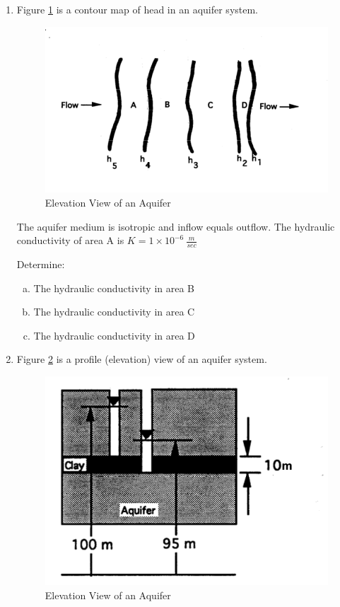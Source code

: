 \documentclass[12pt]{article}
\begin{document}
\begin{enumerate}
\clearpage
\item Figure \ref{fig:HorizontalAquifer} is a contour map of head in an aquifer system. 
\begin{figure}[h!] %
   \centering
   \includegraphics[width=5in]{PlanViewHeads.png} 
   \caption{Elevation View of an Aquifer }
   \label{fig:HorizontalAquifer}
\end{figure}

The aquifer medium is isotropic and inflow equals outflow.
The hydraulic conductivity of area A is $K=1 \times 10^{-6}~\frac{m}{sec}$

Determine:
    \begin{enumerate}[a)]
        \item The hydraulic conductivity in area B
        \item The hydraulic conductivity in area C
        \item The hydraulic conductivity in area D
    \end{enumerate}

\clearpage
\item Figure \ref{fig:VerticalAquifer} is a profile (elevation) view of an aquifer system. 
\begin{figure}[h!] %
   \centering
   \includegraphics[width=5in]{VerticalAquifer.png} 
   \caption{Elevation View of an Aquifer }
   \label{fig:VerticalAquifer}
\end{figure}


\end{enumerate}
\end{document}

